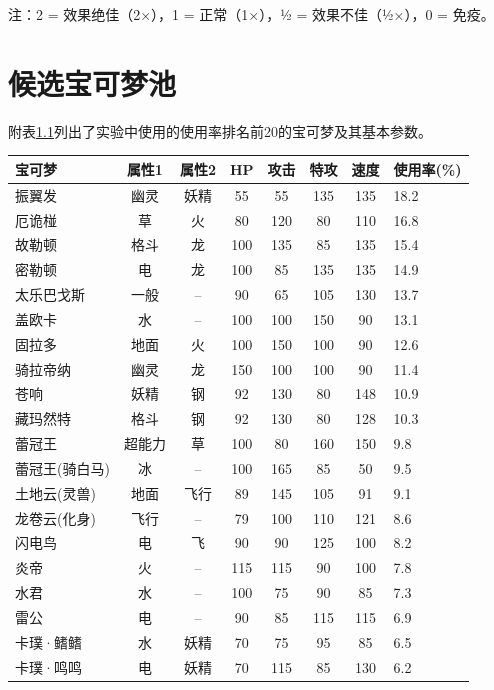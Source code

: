 注：2 = 效果绝佳（2×），1 = 正常（1×），½ = 效果不佳（½×），0 = 免疫。

\chapter{候选宝可梦池}\label{app:pokemon-pool}

附表\ref{tab:top-pokemon}列出了实验中使用的使用率排名前20的宝可梦及其基本参数。

\begin{table}[!htbp]
    \label{tab:top-pokemon}
    \centering
    \footnotesize
    \begin{tabular}{lccccccl}
        \hline
        宝可梦 & 属性1 & 属性2 & HP & 攻击 & 特攻 & 速度 & 使用率(\%) \\
        \hline
        振翼发 & 幽灵 & 妖精 & 55 & 55 & 135 & 135 & 18.2 \\
        厄诡椪 & 草 & 火 & 80 & 120 & 80 & 110 & 16.8 \\
        故勒顿 & 格斗 & 龙 & 100 & 135 & 85 & 135 & 15.4 \\
        密勒顿 & 电 & 龙 & 100 & 85 & 135 & 135 & 14.9 \\
        太乐巴戈斯& 一般 & -- & 90 & 65 & 105 & 130 & 13.7 \\
        盖欧卡 & 水 & -- & 100 & 100 & 150 & 90 & 13.1 \\
        固拉多 & 地面 & 火 & 100 & 150 & 100 & 90 & 12.6 \\
        骑拉帝纳 & 幽灵 & 龙 & 150 & 100 & 100 & 90 & 11.4 \\
        苍响 & 妖精 & 钢 & 92 & 130 & 80 & 148 & 10.9 \\
        藏玛然特 & 格斗 & 钢 & 92 & 130 & 80 & 128 & 10.3 \\
        蕾冠王 & 超能力& 草 & 100 & 80 & 160 & 150 & 9.8 \\
        蕾冠王(骑白马)&冰&--&100&165&85&50&9.5\\
        土地云(灵兽)&地面&飞行&89&145&105&91&9.1\\
        龙卷云(化身)&飞行&--&79&100&110&121&8.6\\
        闪电鸟 & 电 & 飞 & 90 & 90 & 125 & 100 & 8.2 \\
        炎帝 & 火 & -- & 115 & 115 & 90 & 100 & 7.8 \\
        水君 & 水 & -- & 100 & 75 & 90 & 85 & 7.3 \\
        雷公 & 电 & -- & 90 & 85 & 115 & 115 & 6.9 \\
        卡璞·鳍鳍&水&妖精&70&75&95&85&6.5\\
        卡璞·鸣鸣&电&妖精&70&115&85&130&6.2\\
        \hline
    \end{tabular}
\end{table}

